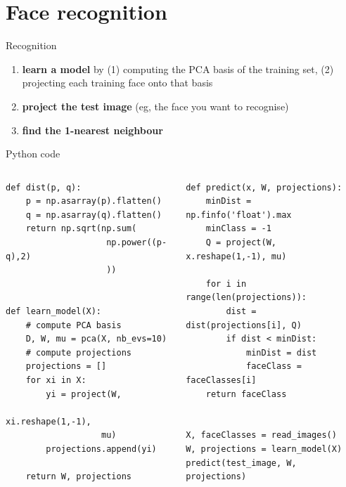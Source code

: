 \documentclass[compress]{beamer}
\begin{document}
\section[Face recognition]{Face recognition}



\begin{frame}{Recognition}

    \begin{enumerate}
        \item \textbf{learn a model} by (1) computing the PCA basis of the
            training set, (2) projecting each training face onto that basis
        \item \textbf{project the test image} (eg, the face you want to
            recognise)
        \item \textbf{find the 1-nearest neighbour}
    \end{enumerate}
\end{frame}

\begin{frame}[fragile]{Python code}


    \begin{columns}
        \begin{column}{0.5\linewidth}
\begin{verbatim}
def dist(p, q):
    p = np.asarray(p).flatten()
    q = np.asarray(q).flatten()
    return np.sqrt(np.sum(
                    np.power((p-q),2)
                    ))


def learn_model(X):
    # compute PCA basis
    D, W, mu = pca(X, nb_evs=10)
    # compute projections
    projections = []
    for xi in X:
        yi = project(W,
                   xi.reshape(1,-1), 
                   mu)
        projections.append(yi)

    return W, projections
\end{verbatim}

        \end{column}
        \begin{column}{0.5\linewidth}


\begin{verbatim}
def predict(x, W, projections):
    minDist = np.finfo('float').max
    minClass = -1
    Q = project(W, x.reshape(1,-1), mu)

    for i in range(len(projections)):
        dist = dist(projections[i], Q)
        if dist < minDist:
            minDist = dist
            faceClass = faceClasses[i]
    return faceClass


X, faceClasses = read_images()
W, projections = learn_model(X)
predict(test_image, W, projections)

\end{verbatim}
        \end{column}
    \end{columns}

\end{frame}
\end{document}
